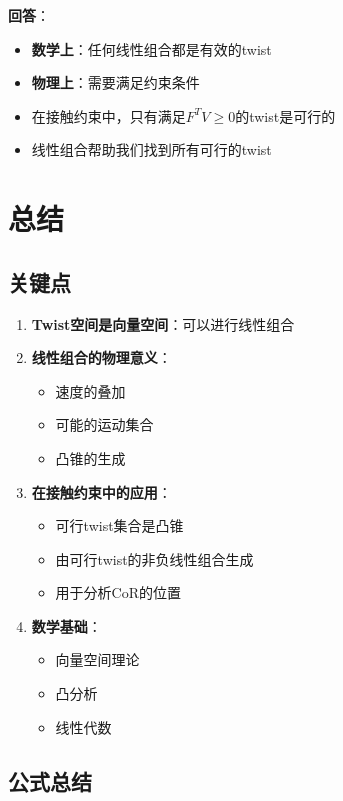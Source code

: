 \documentclass[12pt,a4paper]{article}
\begin{document}
\textbf{回答}：
\begin{itemize}
\item \textbf{数学上}：任何线性组合都是有效的twist
\item \textbf{物理上}：需要满足约束条件
\item 在接触约束中，只有满足$F^T V \geq 0$的twist是可行的
\item 线性组合帮助我们找到所有可行的twist
\end{itemize}

\section{总结}

\subsection{关键点}

\begin{enumerate}
\item \textbf{Twist空间是向量空间}：可以进行线性组合

\item \textbf{线性组合的物理意义}：
  \begin{itemize}
  \item 速度的叠加
  \item 可能的运动集合
  \item 凸锥的生成
  \end{itemize}

\item \textbf{在接触约束中的应用}：
  \begin{itemize}
  \item 可行twist集合是凸锥
  \item 由可行twist的非负线性组合生成
  \item 用于分析CoR的位置
  \end{itemize}

\item \textbf{数学基础}：
  \begin{itemize}
  \item 向量空间理论
  \item 凸分析
  \item 线性代数
  \end{itemize}
\end{enumerate}

\subsection{公式总结}
\end{document}

